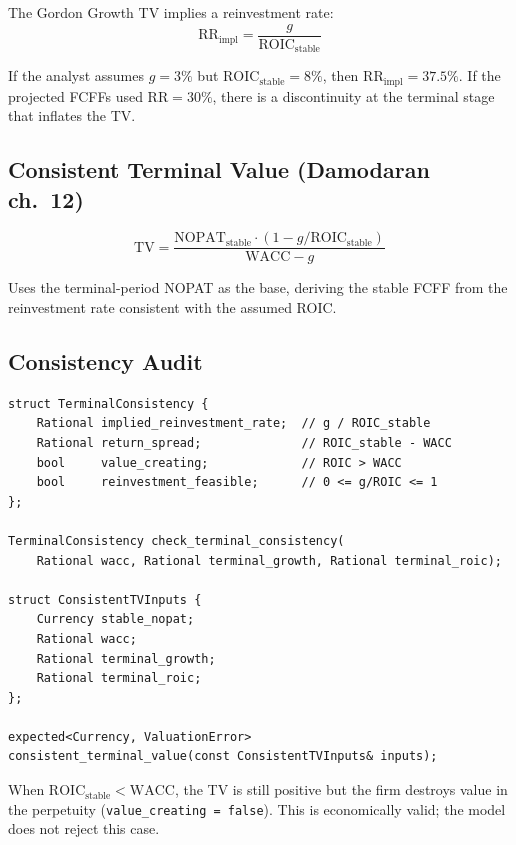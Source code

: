 \documentclass[12pt, a4paper, oneside]{book}
\newcommand{\WACC}{\ensuremath{\mathrm{WACC}}}
\newcommand{\NOPAT}{\ensuremath{\mathrm{NOPAT}}}
\newcommand{\ROIC}{\ensuremath{\mathrm{ROIC}}}
\newcommand{\TV}{\ensuremath{\mathrm{TV}}}
\newcommand{\RR}{\mathrm{RR}}
\begin{document}
The Gordon Growth TV implies a reinvestment rate:
\[
  \RR_{\text{impl}} = \frac{g}{\ROIC_{\text{stable}}}
\]

If the analyst assumes $g = 3\%$ but $\ROIC_{\text{stable}} = 8\%$, then
$\RR_{\text{impl}} = 37.5\%$. If the projected FCFFs used $\RR = 30\%$,
there is a discontinuity at the terminal stage that inflates the TV.

\subsection{Consistent Terminal Value (Damodaran ch.~12)}

\begin{equation}
  \TV = \frac{\NOPAT_{\text{stable}} \cdot (1 - g/\ROIC_{\text{stable}})}{
              \WACC - g}
  \label{eq:tv_consistente}
\end{equation}

Uses the terminal-period NOPAT as the base, deriving the stable FCFF from the
reinvestment rate consistent with the assumed ROIC.

\subsection{Consistency Audit}

\begin{lstlisting}[style=cpp]
struct TerminalConsistency {
    Rational implied_reinvestment_rate;  // g / ROIC_stable
    Rational return_spread;              // ROIC_stable - WACC
    bool     value_creating;             // ROIC > WACC
    bool     reinvestment_feasible;      // 0 <= g/ROIC <= 1
};

TerminalConsistency check_terminal_consistency(
    Rational wacc, Rational terminal_growth, Rational terminal_roic);

struct ConsistentTVInputs {
    Currency stable_nopat;
    Rational wacc;
    Rational terminal_growth;
    Rational terminal_roic;
};

expected<Currency, ValuationError>
consistent_terminal_value(const ConsistentTVInputs& inputs);
\end{lstlisting}

\begin{warning}
When $\ROIC_{\text{stable}} < \WACC$, the TV is still positive but the firm
destroys value in the perpetuity (\texttt{value\_creating = false}).
This is economically valid; the model does not reject this case.
\end{warning}
\end{document}
